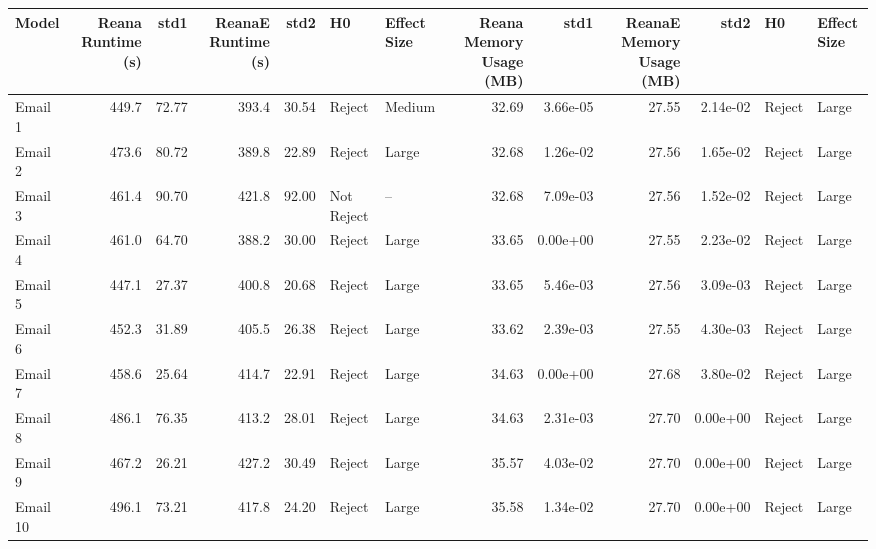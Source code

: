 \begin{tabular}{lrrrrllrrrrll}
\toprule
    Model &  Reana Runtime (s) &    std1 &  ReanaE Runtime (s) &   std2 &          H0 & Effect Size &  Reana Memory Usage (MB) &      std1 &  ReanaE Memory Usage (MB) &      std2 &      H0 & Effect Size \\
\midrule
  Email 1 &              449.7 &   72.77 &               393.4 &  30.54 &      Reject &      Medium &                    32.69 &  3.66e-05 &                     27.55 &  2.14e-02 &  Reject &       Large \\
  Email 2 &              473.6 &   80.72 &               389.8 &  22.89 &      Reject &       Large &                    32.68 &  1.26e-02 &                     27.56 &  1.65e-02 &  Reject &       Large \\
  Email 3 &              461.4 &   90.70 &               421.8 &  92.00 &  Not Reject &          -- &                    32.68 &  7.09e-03 &                     27.56 &  1.52e-02 &  Reject &       Large \\
  Email 4 &              461.0 &   64.70 &               388.2 &  30.00 &      Reject &       Large &                    33.65 &  0.00e+00 &                     27.55 &  2.23e-02 &  Reject &       Large \\
  Email 5 &              447.1 &   27.37 &               400.8 &  20.68 &      Reject &       Large &                    33.65 &  5.46e-03 &                     27.56 &  3.09e-03 &  Reject &       Large \\
  Email 6 &              452.3 &   31.89 &               405.5 &  26.38 &      Reject &       Large &                    33.62 &  2.39e-03 &                     27.55 &  4.30e-03 &  Reject &       Large \\
  Email 7 &              458.6 &   25.64 &               414.7 &  22.91 &      Reject &       Large &                    34.63 &  0.00e+00 &                     27.68 &  3.80e-02 &  Reject &       Large \\
  Email 8 &              486.1 &   76.35 &               413.2 &  28.01 &      Reject &       Large &                    34.63 &  2.31e-03 &                     27.70 &  0.00e+00 &  Reject &       Large \\
  Email 9 &              467.2 &   26.21 &               427.2 &  30.49 &      Reject &       Large &                    35.57 &  4.03e-02 &                     27.70 &  0.00e+00 &  Reject &       Large \\
 Email 10 &              496.1 &   73.21 &               417.8 &  24.20 &      Reject &       Large &                    35.58 &  1.34e-02 &                     27.70 &  0.00e+00 &  Reject &       Large \\

\end{tabular}
